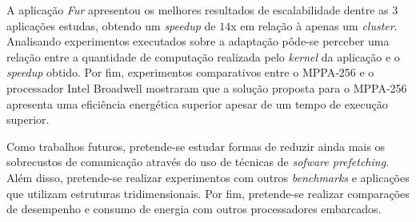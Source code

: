 \documentclass[12pt]{article}
\newcommand{\mppa}{MPPA-256\xspace}
\begin{document}
A aplicação \textit{Fur} apresentou os melhores resultados de escalabilidade
dentre as 3 aplicações estudas, obtendo um \textit{speedup} de $14$x em relação
à apenas um \textit{cluster}. Analisando experimentos executados sobre a
adaptação pôde-se perceber uma relação entre a quantidade de computação
realizada pelo \textit{kernel} da aplicação e o \textit{speedup} obtido. Por
fim, experimentos comparativos entre o \mppa e o processador Intel Broadwell
mostraram que a solução proposta para o \mppa apresenta uma eficiência
energética superior apesar de um tempo de execução superior.

Como trabalhos futuros, pretende-se estudar formas de reduzir ainda mais os
sobrecustos de comunicação através do uso de técnicas de \textit{sofware
    prefetching}. Além disso, pretende-se realizar experimentos com outros
\textit{benchmarks} e aplicações que utilizam estruturas tridimensionais. Por
fim, pretende-se realizar comparações de desempenho e consumo de energia com
outros processadores embarcados.




\end{document}

